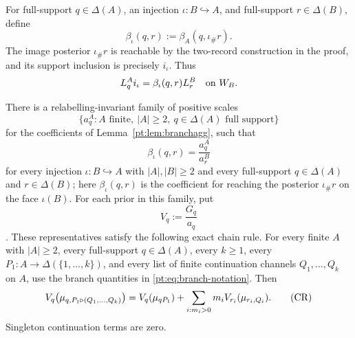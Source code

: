For full-support $q\in\Delta(A)$, an injection
$\iota:B\hookrightarrow A$, and full-support $r\in\Delta(B)$, define
\[
 \beta_\iota(q,r):=\beta_A(q,\iota_\#r).
\]
The image posterior $\iota_\#r$ is reachable by the two-record construction
in the proof, and its support inclusion is precisely $i_\iota$.  Thus
\[
 L_q^A i_\iota=\beta_\iota(q,r)L_r^B
 \quad\hbox{on }W_B.
\]

\begin{lemma}
\label{pt:lem:chain}
There is a relabelling-invariant family of positive scales
\[
\{a_q^A: A\text{ finite},\ |A|\ge2,\ q\in\Delta(A)\text{ full support}\}
\]
for the coefficients of Lemma~\ref{pt:lem:branchagg}, such that
\begin{equation}
 \beta_\iota(q,r)=\frac{a_q^A}{a_r^B}
\tag{FS}\label{pt:eq:facescale}
\end{equation}
for every injection $\iota:B\hookrightarrow A$ with $|A|,|B|\ge2$ and every
full-support $q\in\Delta(A)$ and $r\in\Delta(B)$; here
$\beta_\iota(q,r)$ is the coefficient for reaching the posterior
$\iota_\#r$ on the face $\iota(B)$.  For each prior in this family, put
\[
 V_q:=\frac{G_q}{a_q}
\].
These representatives satisfy the following exact chain rule.  For every
finite $A$ with $|A|\ge2$, every full-support $q\in\Delta(A)$, every $k\ge1$,
every $P_1:A\to\Delta(\{1,\ldots,k\})$, and every list of finite continuation
channels $Q_1,\ldots,Q_k$ on $A$, use the branch quantities in
\eqref{pt:eq:branch-notation}.  Then
\begin{equation}
 V_q\bigl(\mu_{q,P_1\triangleright(Q_1,\ldots,Q_k)}\bigr)
 =V_q(\mu_{qP_1})
  +\sum_{i:m_i>0}m_iV_{r_i}(\mu_{r_i,Q_i}).
\tag{CR}\label{pt:eq:chainrule}
\makeatletter
\g@addto@macro\df@tag{\ltx@label{pt:eq:final-chain}}
\makeatother
\end{equation}
Singleton continuation terms are zero.
\end{lemma}

